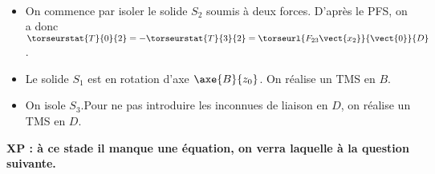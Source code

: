 \ifdifficile


\ifprof
\begin{corrige}~\\
\begin{itemize}
\item On commence par isoler le solide $S_2$ soumis à deux forces. D'après le PFS, on a donc $\torseurstat{T}{0}{2}=-\torseurstat{T}{3}{2}=\torseurl{F_{23}\vect{x_2}}{\vect{0}}{D}$.
\item Le solide $S_1$ est en rotation d'axe $\axe{B}{z_0}$. On réalise un TMS en $B$.
\item On isole $S_3$.Pour ne pas introduire les inconnues de liaison en $D$, on réalise un TMS en $D$.
\end{itemize}

\textbf{XP : à ce stade il manque une équation, on verra laquelle à la question suivante.}
\end{corrige}
\else
\fi
\else
\fi


